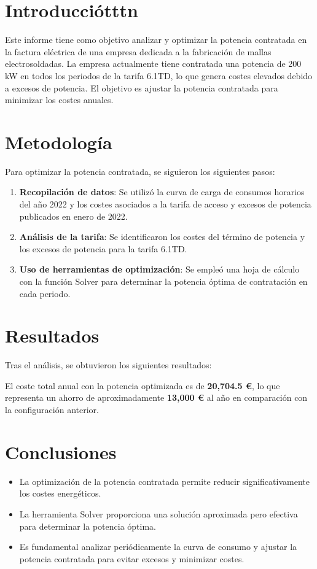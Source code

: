 \documentclass[a4paper,10pt]{article}
\begin{document}
\begin{Form}
\section{Introducciótttn}
Este informe tiene como objetivo analizar y optimizar la potencia contratada en la factura eléctrica de una empresa dedicada a la fabricación de mallas electrosoldadas. La empresa actualmente tiene contratada una potencia de 200 kW en todos los periodos de la tarifa 6.1TD, lo que genera costes elevados debido a excesos de potencia. El objetivo es ajustar la potencia contratada para minimizar los costes anuales.

\section{Metodología}
Para optimizar la potencia contratada, se siguieron los siguientes pasos:

\begin{enumerate}
    \item \textbf{Recopilación de datos}: Se utilizó la curva de carga de consumos horarios del año 2022 y los costes asociados a la tarifa de acceso y excesos de potencia publicados en enero de 2022.
    \item \textbf{Análisis de la tarifa}: Se identificaron los costes del término de potencia y los excesos de potencia para la tarifa 6.1TD.
    \item \textbf{Uso de herramientas de optimización}: Se empleó una hoja de cálculo con la función Solver para determinar la potencia óptima de contratación en cada periodo.
\end{enumerate}

\section{Resultados}
Tras el análisis, se obtuvieron los siguientes resultados:



El coste total anual con la potencia optimizada es de \textbf{20,704.5 €}, lo que representa un ahorro de aproximadamente \textbf{13,000 €} al año en comparación con la configuración anterior.

\section{Conclusiones}
\begin{itemize}
    \item La optimización de la potencia contratada permite reducir significativamente los costes energéticos.
    \item La herramienta Solver proporciona una solución aproximada pero efectiva para determinar la potencia óptima.
    \item Es fundamental analizar periódicamente la curva de consumo y ajustar la potencia contratada para evitar excesos y minimizar costes.
\end{itemize}


\end{Form}
\end{document}
